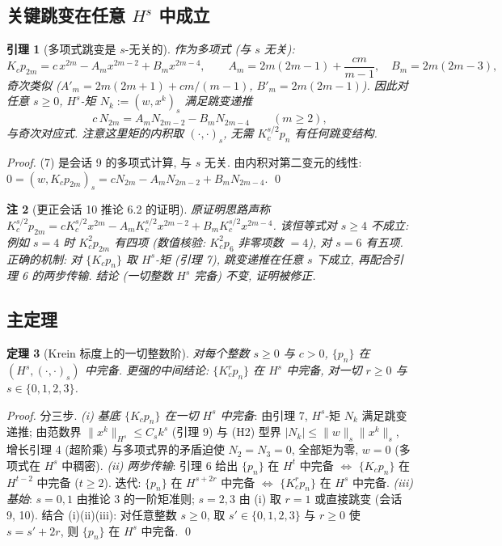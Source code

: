 \documentclass[UTF8]{ctexart}
\newtheorem{theorem}{定理}[section]
\newtheorem{lemma}[theorem]{引理}
\newtheorem{remark}[theorem]{注}
\begin{document}
\subsection{关键跳变在任意 \texorpdfstring{$H^s$}{Hs} 中成立}

\begin{lemma}[多项式跳变是 $s$-无关的]
	作为多项式 (与 $s$ 无关):
	\begin{equation}
		K_c p_{2m} = c\, x^{2m} - A_m x^{2m-2} + B_m x^{2m-4},
		\qquad A_m = 2m(2m-1) + \frac{cm}{m-1}, \quad B_m = 2m(2m-3),
	\end{equation}
	奇次类似 ($A'_m = 2m(2m+1) + cm/(m-1)$, $B'_m = 2m(2m-1)$).
	因此对\emph{任意} $s \geq 0$, $H^s$-矩 $N_k := (w, x^k)_s$ 满足跳变递推
	\begin{equation}
		c\, N_{2m} = A_m N_{2m-2} - B_m N_{2m-4} \qquad (m \geq 2),
	\end{equation}
	与奇次对应式. 注意这里矩的内积取 $(\cdot,\cdot)_s$, 无需 $K_c^{s/2}p_n$
	有任何跳变结构.
\end{lemma}

\begin{proof}
	(7) 是会话 9 的多项式计算, 与 $s$ 无关. 由内积对第二变元的线性:
	$0 = (w, K_c p_{2m})_s = cN_{2m} - A_m N_{2m-2} + B_m N_{2m-4}$. \qed
\end{proof}

\begin{remark}[更正会话 10 推论 6.2 的证明]
	原证明思路声称 $K_c^{s/2}p_{2m} = cK_c^{s/2}x^{2m} - A_mK_c^{s/2}x^{2m-2}
	+ B_mK_c^{s/2}x^{2m-4}$. 该恒等式对 $s \geq 4$ \emph{不}成立: 例如
	$s=4$ 时 $K_c^2 p_{2m}$ 有四项 (数值核验: $K_c^2 p_6$ 非零项数 $= 4$),
	对 $s=6$ 有五项. 正确的机制: 对 $\{K_c p_n\}$ 取 $H^s$-矩 (引理 7),
	跳变递推在任意 $s$ 下成立, 再配合引理 6 的两步传输. 结论 (一切整数
	$H^s$ 完备) 不变, 证明被修正.
\end{remark}

\subsection{主定理}

\begin{theorem}[Krein 标度上的一切整数阶]
	对每个整数 $s \geq 0$ 与 $c > 0$, $\{p_n\}$ 在 $(H^s, (\cdot,\cdot)_s)$
	中完备. 更强的中间结论: $\{K_c^r p_n\}$ 在 $H^s$ 中完备, 对一切
	$r \geq 0$ 与 $s \in \{0,1,2,3\}$.
\end{theorem}

\begin{proof}
	分三步.
	\emph{(i) 基底 $\{K_c p_n\}$ 在一切 $H^s$ 中完备}: 由引理 7,
	$H^s$-矩 $N_k$ 满足跳变递推; 由范数界 $\|x^k\|_{H^s} \leq C_s k^s$
	(引理 9) 与 (H2) 型界 $|N_k| \leq \|w\|_s \|x^k\|_s$, 增长引理 4
	(超阶乘) 与多项式界的矛盾迫使 $N_2 = N_3 = 0$, 全部矩为零,
	$w = 0$ (多项式在 $H^s$ 中稠密).
	\emph{(ii) 两步传输}: 引理 6 给出 $\{p_n\}$ 在 $H^t$ 中完备
	$\iff$ $\{K_c p_n\}$ 在 $H^{t-2}$ 中完备 ($t \geq 2$). 迭代: $\{p_n\}$
	在 $H^{s+2r}$ 中完备 $\iff$ $\{K_c^r p_n\}$ 在 $H^s$ 中完备.
	\emph{(iii) 基始}: $s = 0, 1$ 由推论 3 的一阶矩准则; $s = 2, 3$
	由 (i) 取 $r=1$ 或直接跳变 (会话 9, 10). 结合 (i)(ii)(iii):
	对任意整数 $s \geq 0$, 取 $s' \in \{0,1,2,3\}$ 与 $r \geq 0$ 使
	$s = s' + 2r$, 则 $\{p_n\}$ 在 $H^s$ 中完备. \qed
\end{proof}
\end{document}
